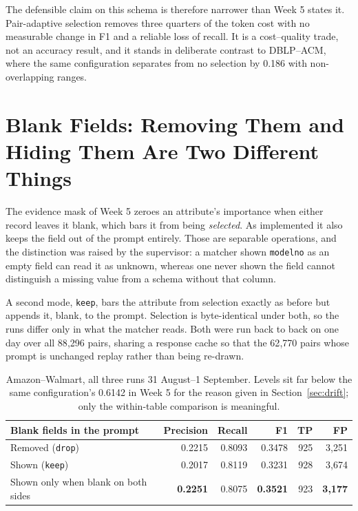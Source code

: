\documentclass[11pt]{article}
\begin{document}
The defensible claim on this schema is therefore narrower than Week 5 states it.
Pair-adaptive selection removes three quarters of the token cost with no measurable change in
F1 and a reliable loss of recall. It is a cost--quality trade, not an accuracy result, and it
stands in deliberate contrast to DBLP--ACM, where the same configuration separates from no
selection by 0.186 with non-overlapping ranges.

\section{Blank Fields: Removing Them and Hiding Them Are Two Different Things}
\label{sec:mask}

The evidence mask of Week 5 zeroes an attribute's importance when either record leaves it
blank, which bars it from being \emph{selected}. As implemented it also keeps the field out of
the prompt entirely. Those are separable operations, and the distinction was raised by the
supervisor: a matcher shown \texttt{modelno} as an empty field can read it as unknown,
whereas one never shown the field cannot distinguish a missing value from a schema without
that column.

A second mode, \texttt{keep}, bars the attribute from selection exactly as before but appends
it, blank, to the prompt. Selection is byte-identical under both, so the runs differ only in
what the matcher reads. Both were run back to back on one day over all 88{,}296 pairs, sharing
a response cache so that the 62{,}770 pairs whose prompt is unchanged replay rather than being
re-drawn.

\begin{table}[H]
\centering
\begin{tabular}{lrrrrr}
\toprule
Blank fields in the prompt & Precision & Recall & F1 & TP & FP \\
\midrule
Removed (\texttt{drop})                & 0.2215 & 0.8093 & 0.3478 & 925 & 3{,}251 \\
Shown (\texttt{keep})                  & 0.2017 & 0.8119 & 0.3231 & 928 & 3{,}674 \\
Shown only when blank on both sides    & \textbf{0.2251} & 0.8075 & \textbf{0.3521} & 923 & \textbf{3{,}177} \\
\bottomrule
\end{tabular}
\caption{Amazon--Walmart, all three runs 31 August--1 September. Levels sit far below the
same configuration's 0.6142 in Week 5 for the reason given in Section~\ref{sec:drift}; only
the within-table comparison is meaningful.}
\end{table}
\end{document}
